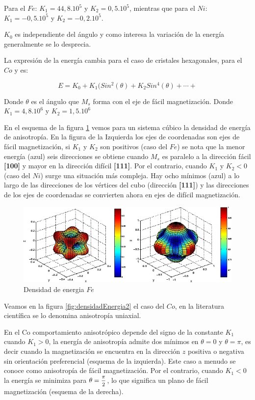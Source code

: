 Para el $Fe$: ${K_{1}=44,8.10^{5}}$ y ${K_{2}=0,5.10^{5}}$, mientras que para el $Ni$: ${K_{1}=-0,5.10^{5}}$ y ${K_{2}=-0,2.10^{5}}$. 

$K_{0}$ es independiente del ángulo y como interesa la variación de la energía generalmente se lo desprecia.

La expresión de la energía cambia para el caso de cristales hexagonales, para el $Co$ y es:

\begin{equation}
E=K_{0}+K_{1}(Sin^{2}(\theta)+K_{2}Sin^{4}(\theta)+\cdots+
\end{equation}

Donde $\theta$ es el ángulo que $M_{s}$ forma con el eje de fácil magnetización. Donde ${K_{1} = 4,8.10^{6}}$ y ${K_{2} = 1,5.10^{6}}$

En el esquema de la figura \ref{fig:densidadEnergia1} vemos para un sistema cúbico la densidad de energía de anisotropía. En la figura de la Izquierda los ejes de coordenadas son ejes de fácil magnetización, si $K_{1}$ y $K_{2}$ son positivos (caso del $Fe$) se nota que la menor energía (azul) seis direcciones se obtiene cuando $M_{s}$ es paralelo a la dirección fácil \textbf{[100]} y mayor en la dirección difícil \textbf{[111]}. Por el contrario, cuando $K_{1}$ y $K_{2} < 0$ (caso  del $Ni$) surge una situación más compleja. Hay ocho mínimos (azul) a lo largo de las direcciones de los vértices del cubo (dirección \textbf{[111]}) y las direcciones de los ejes de coordenadas se convierten ahora en ejes de difícil magnetización.

\begin{figure}[H]
    \centering
    \includegraphics[width=1.0\textwidth]{./Figures/densidadEnergia1}
	\caption{Densidad de energia $Fe$}
	\label{fig:densidadEnergia1}
\end{figure}

Veamos en la figura \ref{fig:densidadEnergia2} el caso del $Co$, en la literatura científica se lo denomina anisotropía uniaxial.

En el Co comportamiento anisotrópico depende del signo de la constante $K_{1}$ cuando $K_{1}> 0$, la energía de anisotropía admite dos mínimos en $\theta=0$ y $\theta=\pi$, es decir cuando la magnetización se encuentra en la dirección $z$ positiva o negativa sin orientación preferencial (esquema de la izquierda). Este caso a menudo se conoce como anisotropía de fácil magnetización. Por el contrario, cuando $K_{1}<0$ la energía se minimiza para ${\theta=\mfrac{\pi}{2}}$, lo que significa un plano de fácil magnetización (esquema de la derecha).

